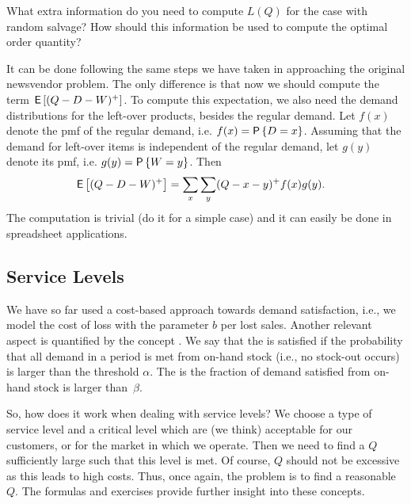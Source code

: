 \begin{exercise}[Continuation]
What extra information do you need to compute $L(Q)$ for the case with random salvage? How should this information be used to compute the optimal order quantity?
\begin{solution}
It can be done following the same steps we have taken in approaching the original newsvendor problem. The only difference is that now we should compute the term $\,\mathsf{E}\left[(Q-D-W)^+\right]$. 
To compute this expectation, we also need the demand distributions for the left-over  products, besides the regular demand. Let $f(x)$ denote the pmf of the regular demand, i.e. $f(x)=\P{D=x}$. Assuming that the demand for left-over items is independent of the regular demand, let $g(y)$ denote its pmf, i.e. $g(y)=\P{W=y}$. Then
\begin{align*}
\,\mathsf{E}\left[(Q-D-W)^+\right] & = \sum_x \sum_y (Q-x-y)^+ f(x) g(y).
\end{align*}
The computation is trivial (do it for a simple case) and it can easily be done in spreadsheet applications.
\end{solution}
\end{exercise}


\subsection{Service Levels}

We have so far used a cost-based approach towards demand satisfaction, i.e., we model the cost of loss with the parameter $b$ per lost sales. Another relevant aspect  is quantified by the concept . 
We say that the  is satisfied if the probability that all demand in a period is met from on-hand stock (i.e., no stock-out occurs) is larger than the threshold $\alpha$.  The  is the fraction of demand satisfied from on-hand stock is larger than~$\beta$. 

So, how does it work when dealing with service levels? We choose a type of service level and  a critical level which are (we think) acceptable for our customers, or for the market in which we operate. Then we need to find a $Q$ sufficiently large such that this level is met. Of course, $Q$ should not be excessive as this leads to high costs. Thus, once again, the problem is to find a reasonable $Q$. The formulas and exercises provide further insight into these concepts.

